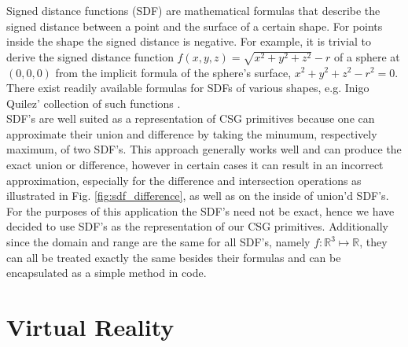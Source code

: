 Signed distance functions (SDF) are mathematical formulas that describe the signed distance between a point and the surface of a certain shape. For points inside the shape the
signed distance is negative. For example, it is trivial to derive the signed distance function $f(x,y,z) = \sqrt{x^2 + y^2 + z^2} - r$ of a sphere at $(0, 0, 0)$ from the implicit formula of the sphere's surface, $x^2 + y^2 + z^2 - r^2 = 0$. There exist readily available formulas for SDFs of various shapes, e.g. Inigo Quilez' collection of such functions \cite{sdf_collection}.\\
SDF's are well suited as a representation of CSG primitives because one can approximate their union and difference by taking the minumum, respectively maximum, of two SDF's. This approach generally works
well and can produce the exact union or difference, however in certain cases it can result in an incorrect approximation, especially for the difference and intersection operations as illustrated in Fig. \ref{fig:sdf_difference}, as well as on the inside of union'd SDF's.
For the purposes of this application the SDF's need not be exact, hence we have decided to use SDF's as the representation of our CSG primitives. Additionally since the domain and range are the same for all SDF's, namely
$f\colon \mathbb{R}^3 \mapsto \mathbb{R}$, they can all be treated exactly the same besides their formulas and can be encapsulated as a simple method in code.


\section{Virtual Reality}

